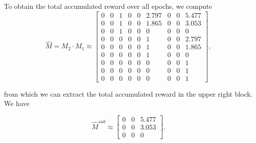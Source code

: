 \documentclass[hidelinks,11pt]{article}
\begin{document}
    To obtain the total accumulated reward over all epochs, we compute
    \begin{equation}
        \label{eq:prod_moments_example}
        \hat{M} = M_2 \cdot M_1 \approx
        \left [
            \begin{array}{ccc|ccc|ccc}
                0 & 0 & 1 & 0 & 0 & 2.797 & 0 & 0 & 5.477 \\
                0 & 0 & 1 & 0 & 0 & 1.865 & 0 & 0 & 3.053 \\
                0 & 0 & 1 & 0 & 0 & 0     & 0 & 0 & 0     \\
                \hline
                0 & 0 & 0 & 0 & 0 & 1     & 0 & 0 & 2.797 \\
                0 & 0 & 0 & 0 & 0 & 1     & 0 & 0 & 1.865 \\
                0 & 0 & 0 & 0 & 0 & 1     & 0 & 0 & 0     \\
                \hline
                0 & 0 & 0 & 0 & 0 & 0     & 0 & 0 & 1     \\
                0 & 0 & 0 & 0 & 0 & 0     & 0 & 0 & 1     \\
                0 & 0 & 0 & 0 & 0 & 0     & 0 & 0 & 1
            \end{array}
            \right ],
    \end{equation}

    from which we can extract the total accumulated reward in the upper right block. We have

    \begin{equation*}
        \hat{M}^{sub} \approx \left [
            \begin{array}{ccc}
                0 & 0 & 5.477 \\
                0 & 0 & 3.053 \\
                0 & 0 & 0
            \end{array}
            \right ].
    \end{equation*}
\end{document}
